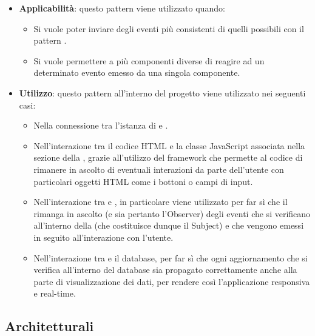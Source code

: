 \begin{itemize}
	\item \textbf{Applicabilità}: questo pattern viene utilizzato quando:
		  \begin{itemize}
		  	 	\item Si vuole poter inviare degli eventi più consistenti di quelli possibili con il pattern .
		  	 	\item Si vuole permettere a più componenti diverse di reagire ad un determinato evento emesso da una singola componente.
		  \end{itemize}
	\item \textbf{Utilizzo}: questo pattern all'interno del progetto viene utilizzato nei seguenti casi:
		  \begin{itemize}
		  		\item Nella connessione tra l'istanza di  e \progettoShort.
		  		\item Nell'interazione tra il codice HTML e la classe JavaScript associata nella sezione della , grazie all'utilizzo del framework  che permette al codice  di rimanere in ascolto di eventuali interazioni da parte dell'utente con particolari oggetti HTML come i bottoni o campi di input.
		  	 	\item Nell'interazione tra  e , in particolare viene utilizzato per far sì che il  rimanga in ascolto (e sia pertanto l'Observer) degli eventi che si verificano all'interno della  (che costituisce dunque il Subject) e che vengono emessi in seguito all'interazione con l'utente.
		  	 	\item Nell'interazione tra  e il database, per far sì che ogni aggiornamento che si verifica all'interno del database sia propagato correttamente anche alla parte di visualizzazione dei dati, per rendere così l'applicazione responsiva e real-time.
		  \end{itemize}
\end{itemize}

\subsection{Architetturali}
